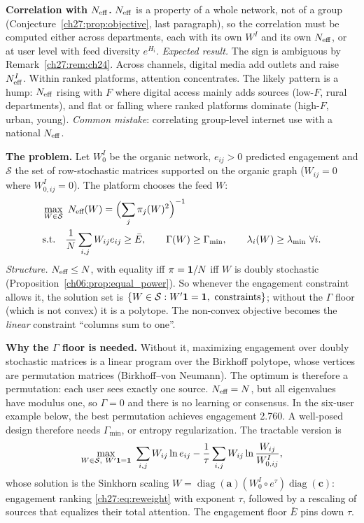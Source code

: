 \documentclass[../solutions_manual.tex]{subfiles}
\begin{document}
 \textbf{Correlation with $N_{\text{eff}}$.} $N_{\text{eff}}$ is a property of a whole network, not of a group (Conjecture~\ref{ch27:prop:objective}, last paragraph), so the correlation must be computed either across departments, each with its own $W^I$ and its own $N_{\text{eff}}$, or at user level with feed diversity $e^{H_i}$. \emph{Expected result.} The sign is ambiguous by Remark~\ref{ch27:rem:ch24}. Across channels, digital media add outlets and raise $N_{\text{eff}}^I$. Within ranked platforms, attention concentrates. The likely pattern is a hump: $N_{\text{eff}}$ rising with $F$ where digital access mainly adds sources (low-$F$, rural departments), and flat or falling where ranked platforms dominate (high-$F$, urban, young). \emph{Common mistake}: correlating group-level internet use with a national $N_{\text{eff}}$.


 \textbf{The problem.} Let $W^I_0$ be the organic network, $e_{ij} > 0$ predicted engagement and $\mathcal{S}$ the set of row-stochastic matrices supported on the organic graph ($W_{ij} = 0$ where $W^I_{0,ij} = 0$). The platform chooses the feed $W$:
\[
\begin{aligned}
&\max_{W\in\mathcal{S}}\ \Neff(W) = \Bigl(\sum_j \pi_j(W)^2\Bigr)^{-1}\\
&\text{s.t.}\quad \frac1N\sum_{i,j}W_{ij}e_{ij} \ge \bar E,\qquad \Gamma(W) \ge \Gamma_{\min},\qquad \lambda_i(W) \ge \lambda_{\min}\ \forall i.
\end{aligned}
\]
\emph{Structure.} $N_{\text{eff}} \le N$, with equality iff $\pi = \mathbf{1}/N$ iff $W$ is doubly stochastic (Proposition~\ref{ch06:prop:equal_power}). So whenever the engagement constraint allows it, the solution set is $\{W \in \mathcal{S}: W'\ones = \ones,\ \text{constraints}\}$; without the $\Gamma$ floor (which is not convex) it is a polytope. The non-convex objective becomes the \emph{linear} constraint ``columns sum to one''.

 \textbf{Why the $\Gamma$ floor is needed.} Without it, maximizing engagement over doubly stochastic matrices is a linear program over the Birkhoff polytope, whose vertices are permutation matrices (Birkhoff--von Neumann). The optimum is therefore a permutation: each user sees exactly one source. $N_{\text{eff}} = N$, but all eigenvalues have modulus one, so $\Gamma = 0$ and there is no learning or consensus. In the six-user example below, the best permutation achieves engagement 2.760. A well-posed design therefore needs $\Gamma_{\min}$, or entropy regularization. The tractable version is
\[
\max_{W \in \mathcal{S},\ W'\ones = \ones}\ \sum_{i,j}W_{ij}\ln e_{ij} - \frac1\tau\sum_{i,j}W_{ij}\ln\frac{W_{ij}}{W^I_{0,ij}},
\]
whose solution is the Sinkhorn scaling $W = \operatorname{diag}(\mathbf{a})(W^I_0 \circ e^{\tau})\operatorname{diag}(\mathbf{c})$: engagement ranking \eqref{ch27:eq:reweight} with exponent $\tau$, followed by a rescaling of sources that equalizes their total attention. The engagement floor $\bar E$ pins down $\tau$.
\end{document}
